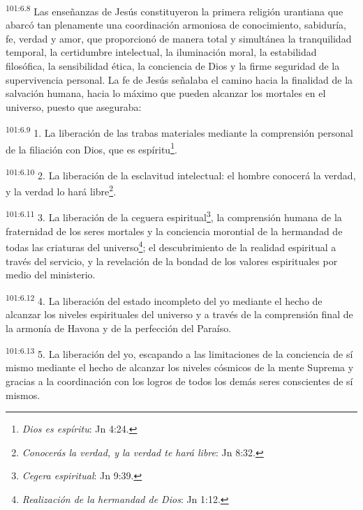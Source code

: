 \par
\textsuperscript{101:6.8} Las enseñanzas de Jesús constituyeron la primera religión urantiana que abarcó tan plenamente una coordinación armoniosa de conocimiento, sabiduría, fe, verdad y amor, que proporcionó de manera total y simultánea la tranquilidad temporal, la certidumbre intelectual, la iluminación moral, la estabilidad filosófica, la sensibilidad ética, la conciencia de Dios y la firme seguridad de la supervivencia personal. La fe de Jesús señalaba el camino hacia la finalidad de la salvación humana, hacia lo máximo que pueden alcanzar los mortales en el universo, puesto que aseguraba:

\par
\textsuperscript{101:6.9} 1. La liberación de las trabas materiales mediante la comprensión personal de la filiación con Dios, que es espíritu\footnote{\textit{Dios es espíritu}: Jn 4:24.}.

\par
\textsuperscript{101:6.10} 2. La liberación de la esclavitud intelectual: el hombre conocerá la verdad, y la verdad lo hará libre\footnote{\textit{Conocerás la verdad, y la verdad te hará libre}: Jn 8:32.}.

\par
\textsuperscript{101:6.11} 3. La liberación de la ceguera espiritual\footnote{\textit{Cegera espiritual}: Jn 9:39.}, la comprensión humana de la fraternidad de los seres mortales y la conciencia morontial de la hermandad de todas las criaturas del universo\footnote{\textit{Realización de la hermandad de Dios}: Jn 1:12.}; el descubrimiento de la realidad espiritual a través del servicio, y la revelación de la bondad de los valores espirituales por medio del ministerio.

\par
\textsuperscript{101:6.12} 4. La liberación del estado incompleto del yo mediante el hecho de alcanzar los niveles espirituales del universo y a través de la comprensión final de la armonía de Havona y de la perfección del Paraíso.

\par
\textsuperscript{101:6.13} 5. La liberación del yo, escapando a las limitaciones de la conciencia de sí mismo mediante el hecho de alcanzar los niveles cósmicos de la mente Suprema y gracias a la coordinación con los logros de todos los demás seres conscientes de sí mismos.

